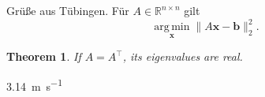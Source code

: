 \documentclass{article}
\newtheorem{theorem}{Theorem}
\begin{document}
Grüße aus Tübingen. Für $A \in \mathbb{R}^{n \times n}$ gilt
\[
  \operatorname*{arg\,min}_{\bm{x}} \lVert A\bm{x}-\bm{b}\rVert_2^2.
\]
\begin{theorem}If $A=A^\top$, its eigenvalues are real.\end{theorem}
\SI{3.14}{\meter\per\second}
\end{document}
